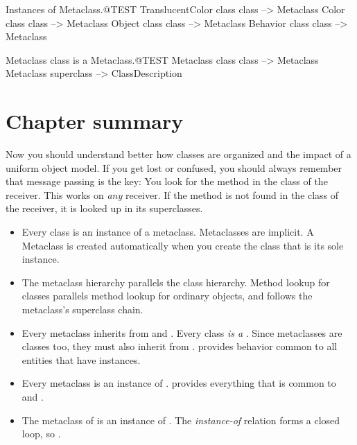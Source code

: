 \documentclass[a4paper,10pt,twoside]{book}
\begin{document}
\begin{example}{Instances of Metaclass.}{@TEST}
TranslucentColor class class --> Metaclass
Color class class                   --> Metaclass
Object class class                 --> Metaclass
Behavior class class              --> Metaclass
\end{example}

\begin{example}{Metaclass class is a Metaclass.}{@TEST}
Metaclass class class --> Metaclass
Metaclass superclass --> ClassDescription
\end{example}

\section{Chapter summary}
Now you should understand better how classes are organized and the impact of a uniform object model.
If you get lost or confused, you should always remember that message passing is the key:
You look for the method in the class of the receiver. 
This works on \emph{any} receiver. 
If the method is not found in the class of the receiver, it is looked up in its superclasses.

\begin{itemize}
\item Every class is an instance of a metaclass.
	Metaclasses are implicit.
	A Metaclass is created automatically when you create the class that is its sole instance.

\item The metaclass hierarchy parallels the class hierarchy.
	Method lookup for classes parallels method lookup for ordinary objects, and follows the metaclass's superclass chain.

\item Every metaclass inherits from  and .
	Every class \emph{is a} . Since metaclasses are classes too, they must also inherit from .
	 provides behavior common to all entities that have instances.

\item Every metaclass is an instance of .
	 provides everything that is common to  and .

\item The metaclass of  is an instance of .
	The \emph{instance-of} relation forms a closed loop, so .
\end{itemize}
\ifx\wholebook\relax\else
\end{document}
